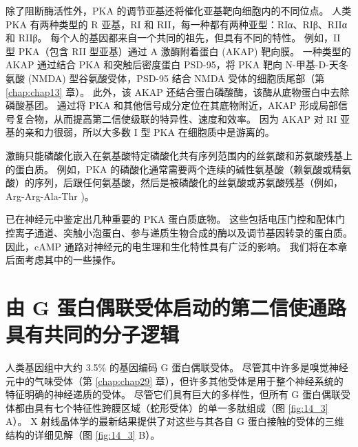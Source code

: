 除了阻断酶活性外，PKA 的调节亚基还将催化亚基靶向细胞内的不同位点。
人类 PKA 有两种类型的 R 亚基，RI 和 RII，每一种都有两种亚型：RIα、RIβ、RIIα 和 RIIβ。
每个人的基因都来自一个共同的祖先，但具有不同的特性。
例如，II 型 PKA（包含 RII 型亚基）通过 A 激酶附着蛋白 (AKAP) 靶向膜。
一种类型的 AKAP 通过结合 PKA 和突触后密度蛋白 PSD-95，将 PKA 靶向 N-甲基-D-天冬氨酸 (NMDA) 型谷氨酸受体，PSD-95 结合 NMDA 受体的细胞质尾部（第 \ref{chap:chap13} 章）。
此外，该 AKAP 还结合蛋白磷酸酶，该酶从底物蛋白中去除磷酸基团。
通过将 PKA 和其他信号成分定位在其底物附近，AKAP 形成局部信号复合物，从而提高第二信使级联的特异性、速度和效率。
因为 AKAP 对 RI 亚基的亲和力很弱，所以大多数 I 型 PKA 在细胞质中是游离的。


激酶只能磷酸化嵌入在氨基酸特定磷酸化共有序列范围内的丝氨酸和苏氨酸残基上的蛋白质。
例如，PKA 的磷酸化通常需要两个连续的碱性氨基酸（赖氨酸或精氨酸）的序列，后跟任何氨基酸，然后是被磷酸化的丝氨酸或苏氨酸残基（例如，Arg-Arg-Ala-Thr )。


已在神经元中鉴定出几种重要的 PKA 蛋白质底物。
这些包括电压门控和配体门控离子通道、突触小泡蛋白、参与递质生物合成的酶以及调节基因转录的蛋白质。
因此，cAMP 通路对神经元的电生理和生化特性具有广泛的影响。
我们将在本章后面考虑其中的一些操作。


\section{由 G 蛋白偶联受体启动的第二信使通路具有共同的分子逻辑}

人类基因组中大约 3.5\% 的基因编码 G 蛋白偶联受体。
尽管其中许多是嗅觉神经元中的气味受体（第 \ref{chap:chap29} 章），但许多其他受体是用于整个神经系统的特征明确的神经递质的受体。
尽管它们具有巨大的多样性，但所有 G 蛋白偶联受体都由具有七个特征性跨膜区域（蛇形受体）的单一多肽组成（图 \ref{fig:14_3} A）。 
X 射线晶体学的最新结果提供了对这些与其各自 G 蛋白接触的受体的三维结构的详细见解（图 \ref{fig:14_3} B）。

